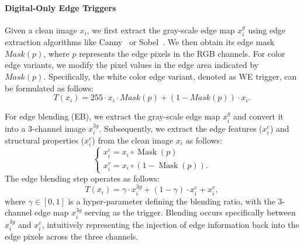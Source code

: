 \documentclass[sigconf,authordraft]{acmart}
\begin{document}
\paragraph{Digital-Only Edge Triggers} 
Given a clean image $x_{i}$, we first extract the gray-scale edge map $x_i^g$ using edge extraction algorithms like Canny~\cite{canny1986computational} or Sobel~\cite{duda1973pattern}. We then obtain its edge mask $Mask(p)$, where $p$ represents the edge pixels in the RGB channels. For color edge variants, we modify the pixel values in the edge area indicated by $Mask(p)$. Specifically, the white color edge variant, denoted as WE trigger, can be formulated as follows:
\begin{equation}
T(x_i) = 255 \cdot x_i \cdot Mask(p) + (1 - Mask(p)) \cdot x_i.
\end{equation}

For edge blending (EB), we extract the gray-scale edge map $x_i^g$ and convert it into a 3-channel image $x^{3g}_{i}$. Subsequently, we extract the edge features ($x^{e}_{i}$) and structural properties ($x^{r}_{i}$) from the clean image $x_i$ as follows:
\begin{equation}
\left\{\begin{array}{l}
x_i^e= x_i \circ \operatorname{Mask}(p) \\
x_i^r= x_i \circ(1-\operatorname{Mask}(p)).
\end{array}\right.
\end{equation}
The edge blending step operates as follows:
\begin{equation}
T\left(x_i\right)=\gamma \cdot x_i^{3 g}+(1-\gamma) \cdot x_i^e+ x_i^r,
    \label{eq:edge blending}
\end{equation}
where $\gamma \in[0, 1]$ is a hyper-parameter defining the blending ratio, with the 3-channel edge map \textbf{$x^{3g}_{i}$} serving as the trigger. Blending occurs specifically between $x^{3g}_{i}$ and $x^{e}_{i}$, intuitively representing the injection of edge information back into the edge pixels across the three channels.

\end{document}
